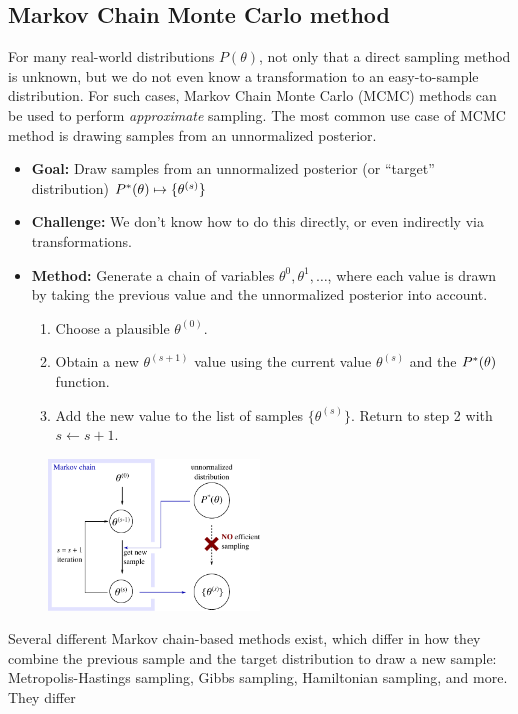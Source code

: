 \subsection{Markov Chain Monte Carlo method}
For many real-world distributions $P(\theta)$, not only that a direct sampling method is unknown, but we do not even know a transformation to an easy-to-sample distribution. For such cases, Markov Chain Monte Carlo (MCMC) methods can be used to perform \emph{approximate} sampling. The most common use case of MCMC method is drawing samples from an unnormalized posterior.
\begin{itemize}
	\item {\bf Goal:} Draw samples from an unnormalized posterior (or ``target'' distribution) $P^\ast(\theta) \mapsto \{\theta^{(s)}\}$
	\item {\bf Challenge:} We don't know how to do this directly, or even indirectly via transformations.
	\item {\bf Method:} Generate a chain of variables $\theta^{0}, \theta^{1}, \ldots $, where each value is drawn by taking the previous value and the unnormalized posterior into account.
	\begin{enumerate}
		\item Choose a plausible $\theta^{(0)}$.
		\item Obtain a new $\theta^{(s+1)}$ value using the current value $\theta^{(s)}$ and the $P^\ast(\theta)$ function.
		\item Add the new value to the list of samples $\{\theta^{(s)}\}$. Return to step 2 with $s \leftarrow s+1$.
	\end{enumerate}
\end{itemize}
\begin{figure}[h]
\centering
	\includegraphics[width=0.5\textwidth]{./figs/07-MCMC.pdf}
\end{figure}
Several different Markov chain-based methods exist, which differ in how they combine the previous sample and the target distribution to draw a new sample: Metropolis-Hastings sampling, Gibbs sampling, Hamiltonian sampling, and more. They differ

